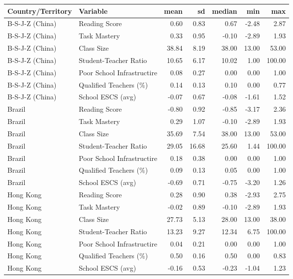 \documentclass[
]{article}
\begin{document}
\begin{table}
\fontsize{12.0pt}{14.0pt}\selectfont
\begin{tabular*}{\linewidth}{@{\extracolsep{\fill}}llrrrrr}
\toprule
Country/Territory & Variable & mean & sd & median & min & max \\ 
\midrule\addlinespace[2.5pt]
B-S-J-Z (China) & Reading Score & 0.60 & 0.83 & 0.67 & -2.48 & 2.87 \\ 
B-S-J-Z (China) & Task Mastery & 0.33 & 0.95 & -0.10 & -2.89 & 1.93 \\ 
B-S-J-Z (China) & Class Size & 38.84 & 8.19 & 38.00 & 13.00 & 53.00 \\ 
B-S-J-Z (China) & Student-Teacher Ratio & 10.65 & 6.17 & 10.02 & 1.00 & 100.00 \\ 
B-S-J-Z (China) & Poor School Infrastructire & 0.08 & 0.27 & 0.00 & 0.00 & 1.00 \\ 
B-S-J-Z (China) & Qualified Teachers (\%) & 0.14 & 0.13 & 0.10 & 0.00 & 0.77 \\ 
B-S-J-Z (China) & School ESCS (avg) & -0.07 & 0.67 & -0.08 & -1.61 & 1.52 \\ 
Brazil & Reading Score & -0.80 & 0.92 & -0.85 & -3.17 & 2.36 \\ 
Brazil & Task Mastery & 0.29 & 1.07 & -0.10 & -2.89 & 1.93 \\ 
Brazil & Class Size & 35.69 & 7.54 & 38.00 & 13.00 & 53.00 \\ 
Brazil & Student-Teacher Ratio & 29.05 & 16.68 & 25.60 & 1.44 & 100.00 \\ 
Brazil & Poor School Infrastructire & 0.18 & 0.38 & 0.00 & 0.00 & 1.00 \\ 
Brazil & Qualified Teachers (\%) & 0.09 & 0.13 & 0.05 & 0.00 & 1.00 \\ 
Brazil & School ESCS (avg) & -0.69 & 0.71 & -0.75 & -3.20 & 1.26 \\ 
Hong Kong & Reading Score & 0.28 & 0.90 & 0.38 & -2.93 & 2.75 \\ 
Hong Kong & Task Mastery & -0.02 & 0.89 & -0.10 & -2.89 & 1.93 \\ 
Hong Kong & Class Size & 27.73 & 5.13 & 28.00 & 13.00 & 38.00 \\ 
Hong Kong & Student-Teacher Ratio & 13.23 & 9.27 & 12.34 & 6.75 & 100.00 \\ 
Hong Kong & Poor School Infrastructire & 0.04 & 0.21 & 0.00 & 0.00 & 1.00 \\ 
Hong Kong & Qualified Teachers (\%) & 0.50 & 0.16 & 0.50 & 0.00 & 0.83 \\ 
Hong Kong & School ESCS (avg) & -0.16 & 0.53 & -0.23 & -1.04 & 1.23 \\ 

\end{tabular*}
\end{table}
\end{document}
